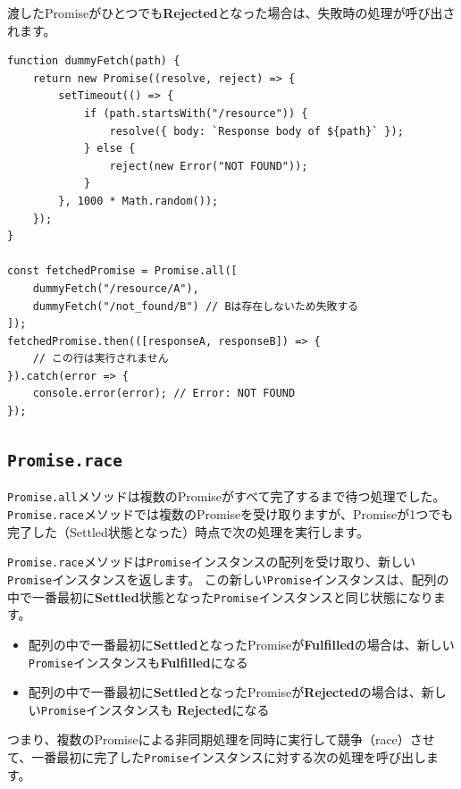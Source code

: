 渡したPromiseがひとつでも\textbf{Rejected}となった場合は、失敗時の処理が呼び出されます。

\begin{lstlisting}
function dummyFetch(path) {
    return new Promise((resolve, reject) => {
        setTimeout(() => {
            if (path.startsWith("/resource")) {
                resolve({ body: `Response body of ${path}` });
            } else {
                reject(new Error("NOT FOUND"));
            }
        }, 1000 * Math.random());
    });
}

const fetchedPromise = Promise.all([
    dummyFetch("/resource/A"),
    dummyFetch("/not_found/B") // Bは存在しないため失敗する
]);
fetchedPromise.then(([responseA, responseB]) => {
    // この行は実行されません
}).catch(error => {
    console.error(error); // Error: NOT FOUND
});
\end{lstlisting}

\hypertarget{promise-race}{%
\subsection{\texorpdfstring{\texttt{Promise.race}}{Promise.race}}\label{promise-race}}

\texttt{Promise.all}メソッドは複数のPromiseがすべて完了するまで待つ処理でした。
\texttt{Promise.race}メソッドでは複数のPromiseを受け取りますが、Promiseが1つでも完了した（Settled状態となった）時点で次の処理を実行します。

\texttt{Promise.race}メソッドは\texttt{Promise}インスタンスの配列を受け取り、新しい\texttt{Promise}インスタンスを返します。
この新しい\texttt{Promise}インスタンスは、配列の中で一番最初に\textbf{Settled}状態となった\texttt{Promise}インスタンスと同じ状態になります。

\begin{itemize}
\item
  配列の中で一番最初に\textbf{Settled}となったPromiseが\textbf{Fulfilled}の場合は、新しい\texttt{Promise}インスタンスも\textbf{Fulfilled}になる
\item
  配列の中で一番最初に\textbf{Settled}となったPromiseが\textbf{Rejected}の場合は、新しい\texttt{Promise}インスタンスも
  \textbf{Rejected}になる
\end{itemize}

つまり、複数のPromiseによる非同期処理を同時に実行して競争（race）させて、一番最初に完了した\texttt{Promise}インスタンスに対する次の処理を呼び出します。

